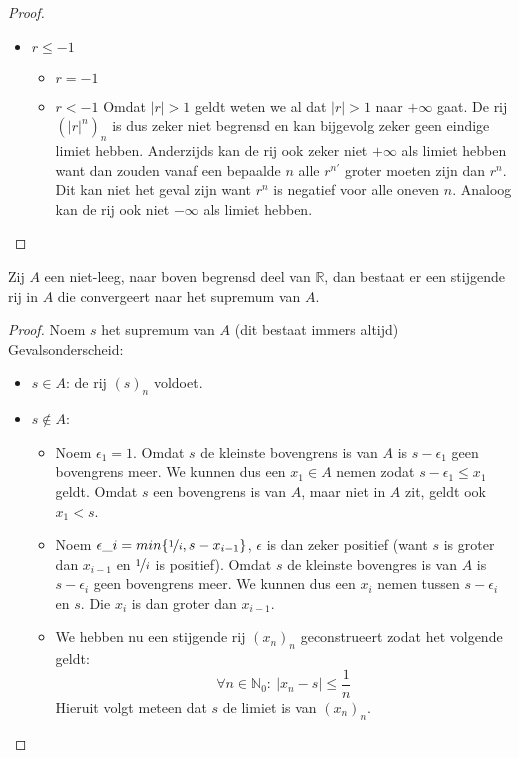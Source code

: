 \documentclass[main.tex]{subfiles}
\begin{document}
\begin{bpr}
\begin{proof}
\begin{itemize}
\begin{itemize}
      \end{itemize}
    \item $r \le -1$
      \begin{itemize}
      \item $r=-1$
      \item $r<-1$
        Omdat $|r|>1$ geldt weten we al dat $|r|>1$ naar $+\infty$ gaat.
        De rij $(|r|^{n})_{n}$ is dus zeker niet begrensd \needed en kan bijgevolg zeker geen eindige limiet hebben. 
        Anderzijds kan de rij ook zeker niet $+\infty$ als limiet hebben want dan zouden vanaf een bepaalde $n$ alle $r^{n'}$ groter moeten zijn dan $r^{n}$.
        Dit kan niet het geval zijn want $r^{n}$ is negatief voor alle oneven $n$.
        Analoog kan de rij ook niet $-\infty$ als limiet hebben.
      \end{itemize}
    \end{itemize}
  \end{proof}
\end{bpr}

\begin{bpr}
  Zij $A$ een niet-leeg, naar boven begrensd deel van $\mathbb{R}$, dan bestaat er een stijgende rij in $A$ die convergeert naar het supremum van $A$.
  
  \begin{proof}
    Noem $s$ het supremum van $A$ (dit bestaat immers altijd)
    Gevalsonderscheid:
    \begin{itemize}
    \item $s\in A$: de rij $(s)_{n}$ voldoet.
    \item $s\not \in A$:\\
      \begin{itemize}
      \item Noem $\epsilon_{1} = 1$.  Omdat $s$ de kleinste bovengrens
        is van $A$ is $s-\epsilon_{1}$ geen bovengrens meer.  We
        kunnen dus een $x_{1}\in A$ nemen zodat $s-\epsilon_{1} \le
        x_{1}$ geldt.  Omdat $s$ een bovengrens is van $A$, maar niet
        in $A$ zit, geldt ook $x_{1}< s$.
      \item Noem $\epsilon\_{i} = min\{ \nicefrac{1}{i}, s-x_{i-1} \}$,
        $\epsilon$ is dan zeker positief (want $s$ is groter dan $x_{i-1}$ en $\nicefrac{1}{i}$ is positief).
        Omdat $s$ de kleinste bovengres is van $A$ is $s-\epsilon_{i}$ geen bovengrens meer.
        We kunnen dus een $x_{i}$ nemen tussen $s-\epsilon_{i}$ en $s$.
        Die $x_{i}$ is dan groter dan $x_{i-1}$.\waarom

      \item We hebben nu een stijgende rij $(x_{n})_{n}$ geconstrueert zodat het volgende geldt:
        \[ \forall n\in \mathbb{N}_{0}:\ |x_{n}-s| \le \frac{1}{n} \]
        Hieruit volgt meteen dat $s$ de limiet is van $(x_{n})_{n}$.\waarom
      \end{itemize}
    \end{itemize}
  \end{proof}
\end{bpr}
\end{document}
